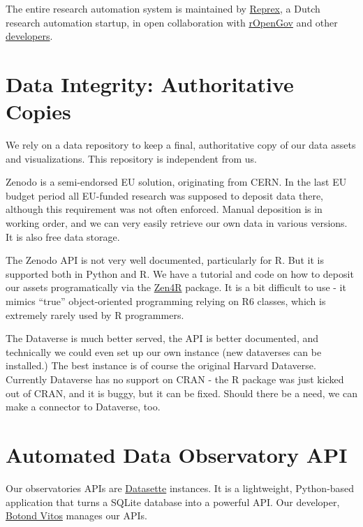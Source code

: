 \documentclass[
  a4paper,
  openany, a4paper, oneside]{book}
\begin{document}
The entire research automation system is maintained by \href{https://reprex.nl/}{Reprex}, a Dutch research automation startup, in open collaboration with \href{http://ropengov.org/}{rOpenGov} and other \href{https://greendeal.dataobservatory.eu/\#contributors}{developers}.

\hypertarget{zenodo}{%
\section{Data Integrity: Authoritative Copies}\label{zenodo}}

We rely on a data repository to keep a final, authoritative copy of our data assets and visualizations. This repository is independent from us.

Zenodo is a semi-endorsed EU solution, originating from CERN. In the last EU budget period all EU-funded research was supposed to deposit data there, although this requirement was not often enforced. Manual deposition is in working order, and we can very easily retrieve our own data in various versions. It is also free data storage.

The Zenodo API is not very well documented, particularly for R. But it is supported both in Python and R. We have a tutorial and code on how to deposit our assets programatically via the \href{https://github.com/eblondel/zen4R/wiki}{Zen4R} package. It is a bit difficult to use - it mimics ``true'' object-oriented programming relying on R6 classes, which is extremely rarely used by R programmers.

The Dataverse is much better served, the API is better documented, and technically we could even set up our own instance (new dataverses can be installed.) The best instance is of course the original Harvard Dataverse. Currently Dataverse has no support on CRAN - the R package was just kicked out of CRAN, and it is buggy, but it can be fixed. Should there be a need, we can make a connector to Dataverse, too.

\hypertarget{api}{%
\section{Automated Data Observatory API}\label{api}}

Our observatories APIs are \href{https://datasette.io/}{Datasette} instances. It is a lightweight, Python-based application that turns a SQLite database into a powerful API. Our developer, \href{https://music.dataobservatory.eu/author/botond-vitos/}{Botond Vitos} manages our APIs.
\end{document}
